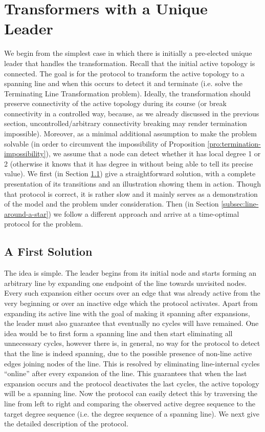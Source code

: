 \documentclass[preprint]{elsarticle}
\begin{document}
\section{Transformers with a Unique Leader}
\label{sec:unique-leader}

We begin from the simplest case in which there is initially a pre-elected unique leader that handles the transformation. Recall that the initial active topology is connected. The goal is for the protocol to transform the active topology to a spanning line and when this occurs to detect it and terminate (i.e. solve the Terminating Line Transformation problem). Ideally, the transformation should preserve connectivity of the active topology during its course (or break connectivity in a controlled way, because, as we already discussed in the previous section, uncontrolled/arbitrary connectivity breaking may render termination impossible). Moreover, as a minimal additional assumption to make the problem solvable (in order to circumvent the impossibility of Proposition \ref{pro:termination-impossibility}), we assume that a node can detect whether it has local degree 1 or 2 (otherwise it knows that it has degree in  without being able to tell its precise value). We first (in Section \ref{subsec:cycle-elimination}) give a straightforward solution, with a complete presentation of its transitions and an illustration showing them in action. Though that protocol is correct, it is rather slow and it mainly serves as a demonstration of the model and the problem under consideration. Then (in Section \ref{subsec:line-around-a-star}) we follow a different approach and arrive at a time-optimal protocol for the problem.

\subsection{A First Solution}
\label{subsec:cycle-elimination}

The idea is simple. The leader begins from its initial node and starts forming an arbitrary line by expanding one endpoint of the line towards unvisited nodes. Every such expansion either occurs over an edge that was already active from the very beginning or over an inactive edge which the protocol activates. Apart from expanding its active line with the goal of making it spanning after  expansions, the leader must also guarantee that eventually no cycles will have remained. One idea would be to first form a spanning line and then start eliminating all unnecessary cycles, however there is, in general, no way for the protocol to detect that the line is indeed spanning, due to the possible presence of non-line active edges joining nodes of the line. This is resolved by eliminating line-internal cycles ``online'' after every expansion of the line. This guarantees that when the last expansion occurs and the protocol deactivates the last cycles, the active topology will be a spanning line. Now the protocol can easily detect this by traversing the line from left to right and comparing the observed active degree sequence to the target degree sequence  (i.e. the degree sequence of a spanning line). We next give the detailed description of the protocol.\\  
\end{document}
